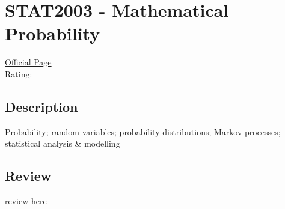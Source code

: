 \hypertarget{STAT2003}{\section{STAT2003 - Mathematical Probability}}

\large
\textcolor{turbo_purple}{\href{https://my.uq.edu.au/programs-courses/course.html?course_code=STAT2003}{Official Page}} \\
Rating: \cstar\cstar\cstar\cstar\ostar

\normalsize
\subsection*{Description}
Probability; random variables; probability distributions; Markov processes; statistical analysis \& modelling

\subsection*{Review}
review here
